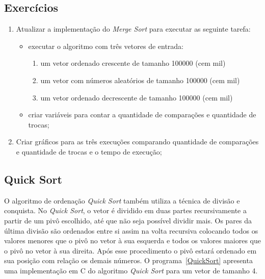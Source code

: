 \documentclass[11pt,fleqn]{book} %
\begin{document}
\subsection*{Exercícios}
\begin{enumerate}
	\item Atualizar a implementação do \textit{Merge Sort} para executar as seguinte tarefa:
	\begin{itemize}
		\item executar o algoritmo com três vetores de entrada:
		\begin{enumerate}
			\item um vetor ordenado crescente de tamanho 100000 (cem mil)
			\item um vetor com números aleatórios de tamanho 100000 (cem mil)
			\item um vetor ordenado decrescente de tamanho 100000 (cem mil)
		\end{enumerate} 
		\item criar variáveis para contar a quantidade de comparações e quantidade de trocas;
	\end{itemize} 
	\item Criar gráficos para as três execuções comparando quantidade de comparações e quantidade de trocas e o tempo de execução;
\end{enumerate} 


\newpage
\subsection*{Quick Sort}
O algoritmo de ordenação \textit{Quick Sort} também utiliza a técnica de divisão e conquista.
No \textit{Quick Sort}, o vetor é dividido em duas partes recursivamente a partir de um pivô escolhido, até que não seja possível dividir mais. 
Os pares da última divisão são ordenados entre si assim na volta recursiva colocando todos os valores menores que o pivô no vetor à sua esquerda e todos os valores maiores que o pivô no vetor à sua direita.
Após esse procedimento o pivô estará ordenado em sua posição com relação os demais números.
O programa~\ref{QuickSort} apresenta uma implementação em C do algoritmo \textit{Quick Sort} para um vetor de tamanho 4.
\label{QuickSort}
\end{document}
